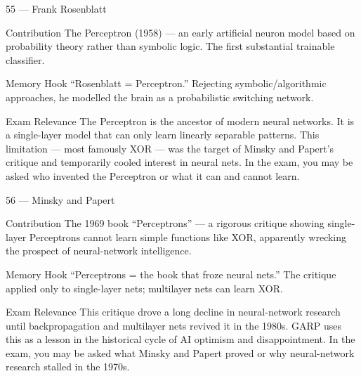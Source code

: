\documentclass[aspectratio=169,8pt]{beamer}
\begin{document}
	\begin{frame}{55 --- Frank Rosenblatt}
		\begin{block}{Contribution}
			The Perceptron (1958) --- an early artificial neuron model based on probability theory rather than symbolic logic. The first substantial trainable classifier.
		\end{block}
		\begin{block}{Memory Hook}
			``Rosenblatt = Perceptron.'' Rejecting symbolic/algorithmic approaches, he modelled the brain as a probabilistic switching network.
		\end{block}
		\begin{block}{Exam Relevance}
			The Perceptron is the ancestor of modern neural networks. It is a single-layer model that can only learn linearly separable patterns. This limitation --- most famously XOR --- was the target of Minsky and Papert's critique and temporarily cooled interest in neural nets. In the exam, you may be asked who invented the Perceptron or what it can and cannot learn.
		\end{block}
	\end{frame}
	
	\begin{frame}{56 --- Minsky and Papert}
		\begin{block}{Contribution}
			The 1969 book ``Perceptrons'' --- a rigorous critique showing single-layer Perceptrons cannot learn simple functions like XOR, apparently wrecking the prospect of neural-network intelligence.
		\end{block}
		\begin{block}{Memory Hook}
			``Perceptrons = the book that froze neural nets.'' The critique applied only to single-layer nets; multilayer nets can learn XOR.
		\end{block}
		\begin{block}{Exam Relevance}
			This critique drove a long decline in neural-network research until backpropagation and multilayer nets revived it in the 1980s. GARP uses this as a lesson in the historical cycle of AI optimism and disappointment. In the exam, you may be asked what Minsky and Papert proved or why neural-network research stalled in the 1970s.
		\end{block}
	\end{frame}
	
\end{document}
